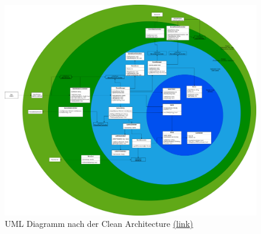 \begin{figure}[!ht]
  \centering
  \includegraphics[height=0.78\textheight, angle =90]{Bilder/CleanArchitectureAFTERinMain.PNG}
  \caption[UML Diagramm nach der Clean Architecture mit der Initialisierung in der Main]{UML Diagramm nach der Clean Architecture \href{https://github.com/EinToni/WortfinderDoku/blob/main/Bilder/CleanArchitectureAFTERinMain.png}{(link)}}
  \label{Abb:CleanArchitectureAFTERinMain}
\end{figure}

\endinput